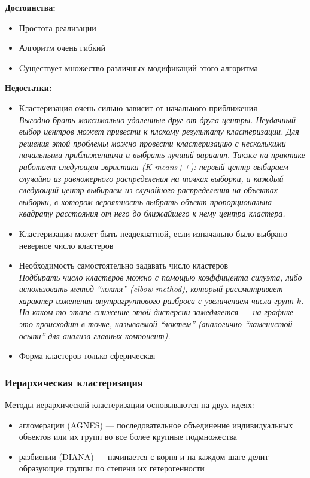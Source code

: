 \documentclass[10pt]{article}
\begin{document}
	\textbf{Достоинства:}
	\begin{itemize} 
		\item Простота реализации
		\item Алгоритм очень гибкий 
		\item Cуществует множество различных модификаций этого алгоритма
	\end{itemize}
	
	\textbf{Недостатки:} 
	\begin{itemize}
		\item Кластеризация очень сильно зависит от начального приближения\\
		\textit{Выгодно брать максимально удаленные друг от друга центры. Неудачный выбор центров может привести к плохому результату кластеризации. Для решения этой проблемы можно провести кластеризацию с несколькими начальными приближениями и выбрать лучший вариант.
		Также на практике работает следующая эвристика (K-means++): первый центр выбираем случайно из равномерного распределения на точках выборки, а каждый следующий центр выбираем из случайного распределения на объектах выборки, в котором вероятность выбрать объект пропорциональна квадрату расстояния от него до ближайшего к нему центра кластера.}
		
		\item Кластеризация может быть неадекватной, если изначально было выбрано неверное число кластеров 
		\item Необходимость самостоятельно задавать число кластеров\\ 
		\textit{Подбирать число кластеров можно с помощью коэффицента силуэта, либо использовать метод “локтя” (elbow method), который рассматривает характер изменения внутригруппового разброса с увеличением числа групп $k$. На каком-то этапе снижение этой дисперсии замедляется --- на графике это происходит в точке, называемой “локтем” (аналогично “каменистой осыпи” для анализа главных компонент).}
		
		\item Форма кластеров только сферическая
	\end{itemize}

\subsubsection{Иерархическая кластеризация}
	
	Методы иерархической кластеризации основываются на двух идеях:
	\begin{itemize}
		\item агломерации (AGNES) --- последовательное объединение индивидуальных объектов или их групп во все более крупные подмножества
		\item разбиении (DIANA) ---  начинается с корня и на каждом шаге делит образующие группы по степени их гетерогенности
	\end{itemize}
\end{document}
